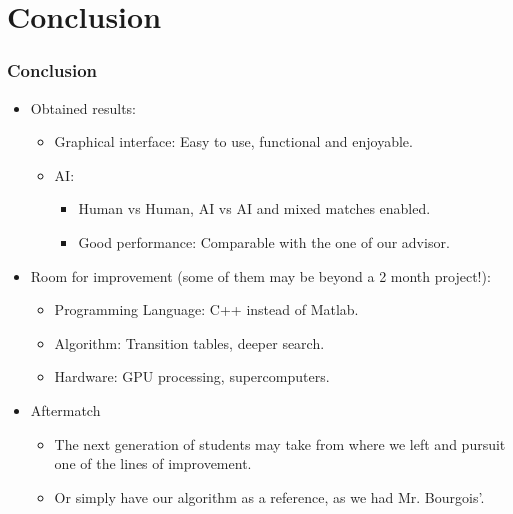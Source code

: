 \documentclass[10pt]{beamer}
\begin{document}
\section{Conclusion}
\begin{frame}
\frametitle{Conclusion}

	\begin{itemize}
		
		\item Obtained results:
		  
		\begin{itemize}
			\item Graphical interface: Easy to use, functional and enjoyable.
			\item AI:
			\begin{itemize}
			  \item Human vs Human, AI vs AI and mixed matches enabled.
			  \item Good performance: Comparable with the one of our advisor.
			\end{itemize}
		\end{itemize} 
		  
		
		 \item Room for improvement (some of them may be beyond a 2 month project!):
		 	\begin{itemize}
			  \item Programming Language: C++ instead of Matlab.
			  \item Algorithm: Transition tables, deeper search.
			  \item Hardware: GPU processing, supercomputers.
		 	\end{itemize}
		 	
	
		\item Aftermatch
		 	\begin{itemize}
			  \item The next generation of students may take from where we left and
			  pursuit one of the lines of improvement.
			  \item Or simply have our algorithm as a reference, as we had Mr.
			  Bourgois'.
		 	\end{itemize}
		 
	\end{itemize}
\end{frame}

\end{document}
